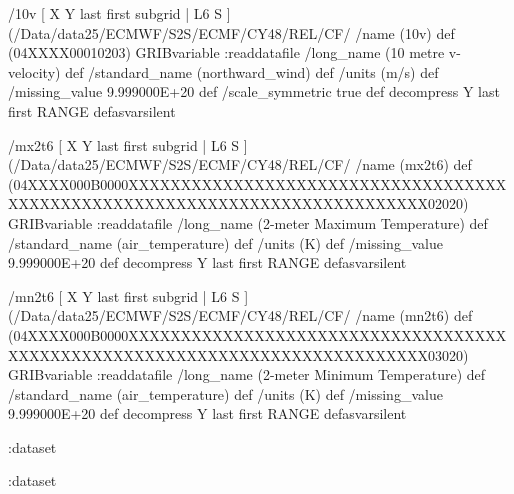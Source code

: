 \begin{ingrid}
/10v { [ X Y last first subgrid | L6 S ] (/Data/data25/ECMWF/S2S/ECMF/CY48/REL/CF/%
/name (10v) def
(04XXXX00010203) GRIBvariable
:readdatafile
/long_name (10 metre v-velocity) def
/standard_name (northward_wind) def
/units (m/s) def
/missing_value 9.999000E+20 def
/scale_symmetric true def
decompress
Y last first RANGE
} defasvarsilent

/mx2t6 { [ X Y last first subgrid | L6  S ] (/Data/data25/ECMWF/S2S/ECMF/CY48/REL/CF/%
/name (mx2t6) def
(04XXXX000B0000XXXXXXXXXXXXXXXXXXXXXXXXXXXXXXXXXXXXXXXXXXXXXXXXXXXXXXXXXXXXXXXXXXXXXXXXXXXX02020) GRIBvariable
:readdatafile
/long_name (2-meter Maximum Temperature) def
/standard_name (air_temperature) def
/units (K) def
/missing_value 9.999000E+20 def
decompress
Y last first RANGE
} defasvarsilent

/mn2t6 { [ X Y last first subgrid | L6 S ] (/Data/data25/ECMWF/S2S/ECMF/CY48/REL/CF/%
/name (mn2t6) def
(04XXXX000B0000XXXXXXXXXXXXXXXXXXXXXXXXXXXXXXXXXXXXXXXXXXXXXXXXXXXXXXXXXXXXXXXXXXXXXXXXXXXX03020) GRIBvariable
:readdatafile
/long_name (2-meter Minimum Temperature) def
/standard_name (air_temperature) def
/units (K) def
/missing_value 9.999000E+20 def
decompress
Y last first RANGE
} defasvarsilent


:dataset

:dataset

\end{ingrid}

